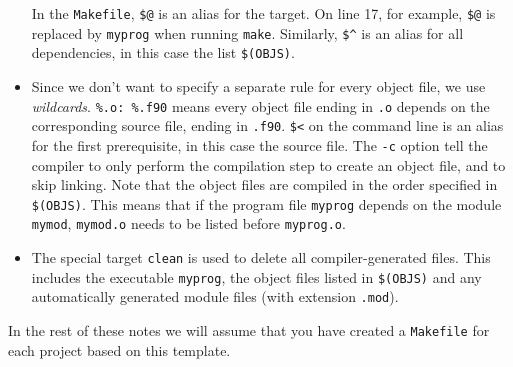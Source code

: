 \begin{itemize}
    In the \texttt{Makefile}, \texttt{\$@} is an alias for the target.
    On line 17, for example, \texttt{\$@} is replaced by \texttt{myprog} when running \texttt{make}.
    Similarly, \texttt{\$\^} is an alias for all dependencies, in this case the list \texttt{\$(OBJS)}.
  \item Since we don't want to specify a separate rule for every object file, we use \emph{wildcards}.
    \texttt{\%.o: \%.f90} means every object file ending in \texttt{.o} depends on the corresponding source file, ending in \texttt{.f90}.
    \texttt{\$<} on the command line is an alias for the first prerequisite, in this case the source file.
    The \texttt{-c} option tell the compiler to only perform the compilation step to create an object file, and to skip linking.
    Note that the object files are compiled in the order specified in \texttt{\$(OBJS)}.
    This means that if the program file \texttt{myprog} depends on the module \texttt{mymod}, \texttt{mymod.o} needs to be listed before \texttt{myprog.o}.
  \item The special target \texttt{clean} is used to delete all compiler-generated files.
    This includes the executable \texttt{myprog}, the object files listed in \texttt{\$(OBJS)} and any automatically generated module files (with extension \texttt{.mod}).
\end{itemize}
In the rest of these notes we will assume that you have created a \texttt{Makefile} for each project based on this template.
